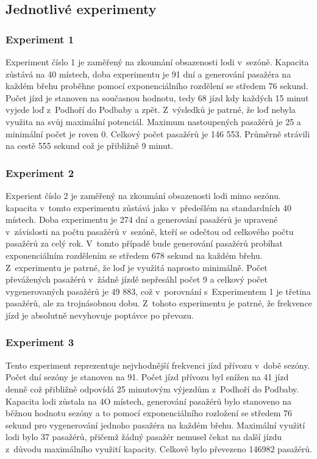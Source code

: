 \documentclass[11pt,a4paper]{article}
\begin{document}
	\subsection{Jednotlivé experimenty}

	\subsubsection{Experiment 1}
	Experiment číslo 1 je zaměřený na zkoumání obsazenosti lodi v~sezóně. Kapacita
	zůstává na 40 místech, doba experimentu je 91 dní \cite{WIKI:LETO} a generování pasažéra
	na každém břehu proběhne pomocí exponenciálního rozdělení se středem 76 sekund.
	Počet jízd je stanoven na současnou hodnotu, tedy 68 jízd kdy každých 15 minut
	vyjede loď z~Podhoří do Podbaby a zpět.	Z~výsledků je patrné, že loď nebyla využita
	na svůj maximální potenciál. Maximum nastoupených pasažérů je 25 a minimální počet je roven 0.
	Celkový počet pasažérů je 146 553. Průměrně strávili na cestě 555 sekund což je přibližně 9 minut.

 \subsubsection{Experiment 2}
  Experient číslo 2 je zaměřený na zkoumání obsazenosti lodi mimo sezónu. kapacita
	v~tomto experimentu zůstává jako v~předešlém na standardních 40 místech. Doba experimentu
	je 274 dní a generování pasažérů je upravené v~závislosti na počtu pasažérů v~sezóně,
	kteří se odečtou od celkového počtu pasažérů za celý rok. V~tomto případě bude generování
	pasažérů probíhat exponenciálním rozdělením se středem 678 sekund na každém břehu.
	Z~experimentu je patrné, že loď je využitá naprosto minimálně. Počet převážených pasažérů
	v~žádně jízdě nepřesáhl počet 9 a celkový počet vygenerovaných pasažérů je 49 883, což
	v~porovnání s~Experimentem 1 je třetina pasažérů, ale za trojnásobnou dobu.
	Z~tohoto experimentu je patrné, že frekvence jízd je absolutně nevyhovuje poptávce po převozu.

	\subsubsection{Experiment 3}
	Tento experiment reprezentuje nejvhodnější frekvenci jízd přívozu v~době sezóny. Počet dní sezóny je stanoven na 91.
	Počet jízd přívozu byl snížen na 41 jízd denně což přibližně odpovídá 25 minutovým výjezdům z~Podhoří do Podbaby.
	Kapacita lodi zůstala na 4O místech, generování pasažérů bylo stanoveno na běžnou hodnotu
	sezóny a to pomocí exponenciálního rozložení se středem 76 sekund pro vygenerování jednoho pasažéra
	na každém břehu.
	Maximální využití lodi bylo 37 pasažérů, přičemž žádný pasažér nemusel čekat na další jízdu
z~důvodu maximálního využití kapacity. Celkově bylo převezeno 146982 pasažérů.
\end{document}
